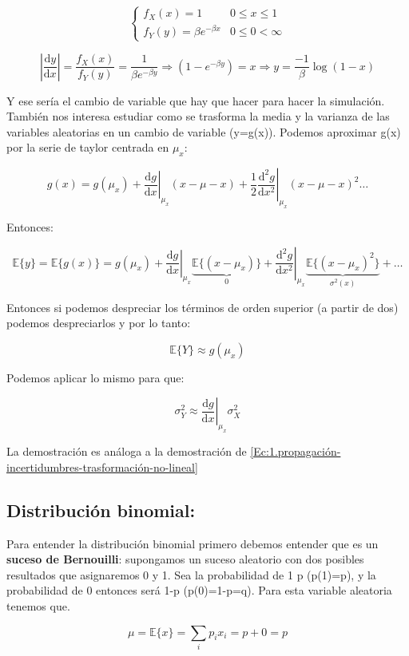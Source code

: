 \documentclass[12pt,a4paper]{book}
\newcommand{\D}{\mathrm{d}}
\newcommand{\EE}[1]{ \mathbb{E} \{ #1 \}  }
\begin{document}
\begin{displaymath}
\left\lbrace \begin{array}{ll}
f_X(x) =1  & 0 \leq x \leq 1\\
f_Y (y) = \beta e^{-\beta x} & 0 \leq 0 < \infty
\end{array} \right. 
\end{displaymath}

$$ \left| \dfrac{\D y}{\D x} \right| = \dfrac{f_X(x)}{f_Y(y)} = \dfrac{1}{\beta e^{-\beta y}} \Longrightarrow (1-e^{-\beta y})=x \Longrightarrow y = \frac{-1}{\beta} \log(1-x) $$

Y ese sería el cambio de variable que hay que hacer para hacer la simulación. También nos interesa estudiar como se trasforma la media y la varianza de las variables aleatorias en un cambio de variable (y=g(x)). Podemos aproximar g(x) por la serie de taylor centrada en $\mu_x$:

$$g(x) = g(\mu_x) + \left. \dfrac{\D g}{\D x} \right|_{\mu_x} (x-\mu-x) + \dfrac{1}{2}  \left. \dfrac{\D^2 g}{\D x^2} \right|_{\mu_x} (x-\mu-x)^2 \ldots $$

Entonces:

$$ \EE{y} = \EE{g(x)} = g(\mu_x) + \left. \dfrac{\D g}{\D x} \right|_{\mu_x} \underbrace{\EE{(x-\mu_x)}}_{0} + \left. \dfrac{\D^2 g}{\D x^2} \right|_{\mu_x} \underbrace{\EE{(x-\mu_x)^2}}_{\sigma^2(x)} + \ldots $$

Entonces si podemos despreciar los términos de orden superior (a partir de dos) podemos despreciarlos y por lo tanto:

$$ \EE{Y} \approx g(\mu_x) $$ 

Podemos aplicar lo mismo para que:

$$ \sigma^2_Y \approx \left. \dfrac{\D g}{\D x} \right|_{\mu_x} \sigma^2_X $$

La demostración es análoga a la demostración de \ref{Ec:1.propagación-incertidumbres-trasformación-no-lineal}

\subsection{Distribución binomial:}
Para entender la distribución binomial primero debemos entender que es un \textbf{suceso de Bernouilli}: supongamos un suceso aleatorio con dos posibles resultados que asignaremos 0 y 1. Sea la probabilidad de 1 p (p(1)=p), y la probabilidad de 0 entonces será 1-p (p(0)=1-p=q). Para esta variable aleatoria tenemos que.

$$ \mu = \EE{x} = \sum_i p_i x_i = p + 0 = p $$
\end{document}
